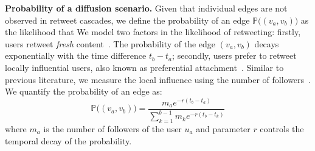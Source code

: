 \textbf{Probability of a diffusion scenario.}
Given that individual edges are not observed in retweet cascades, we define the probability of an edge $\mathds{P}\big((v_a, v_b)\big)$ as the likelihood that
We model two factors in the likelihood of retweeting:
firstly, users retweet \emph{fresh} content~\cite{Wu2007}.
The probability of the edge $(v_a, v_b)$ decays exponentially with the time difference $t_b - t_a$;
secondly, users prefer to retweet locally influential users, also known as preferential attachment~\cite{Barabasi2005}.
Similar to previous literature, we measure the local influence using the number of followers~\cite{kwak2010twitter,Cha2010,Rizoiu2018}.
We quantify the probability of an edge as:
\begin{equation} \label{eq:prob-edge}
	\mathds{P}\big((v_a, v_b)\big) = \frac{m_a e^{-r({t_b-t_a})}}{\sum_{k=1}^{b-1} m_k e^{-r({t_b-t_k})}}
\end{equation}
where
$m_a$ is the number of followers of the user $u_a$ and
parameter $r$ controls the temporal decay of the probability.

